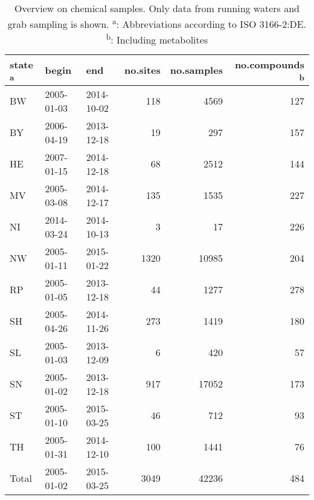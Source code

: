 \begin{table}[ht]
\centering
\caption{Overview on chemical samples. Only data from running waters and grab
sampling is shown. \textsuperscript{a}: Abbreviations according to ISO 3166-2:DE. 
      \textsuperscript{b}: Including metabolites} 
\label{tab:phch_overview}
\begin{tabular}{lllrrr}
  \toprule
state \textsuperscript{a} & begin & end & no.sites & no.samples & no.compounds \textsuperscript{b} \\ 
  \midrule
BW & 2005-01-03 & 2014-10-02 & 118 & 4569 & 127 \\ 
  BY & 2006-04-19 & 2013-12-18 & 19 & 297 & 157 \\ 
  HE & 2007-01-15 & 2014-12-18 & 68 & 2512 & 144 \\ 
  MV & 2005-03-08 & 2014-12-17 & 135 & 1535 & 227 \\ 
  NI & 2014-03-24 & 2014-10-13 & 3 & 17 & 226 \\ 
  NW & 2005-01-11 & 2015-01-22 & 1320 & 10985 & 204 \\ 
  RP & 2005-01-05 & 2013-12-18 & 44 & 1277 & 278 \\ 
  SH & 2005-04-26 & 2014-11-26 & 273 & 1419 & 180 \\ 
  SL & 2005-01-03 & 2013-12-09 & 6 & 420 & 57 \\ 
  SN & 2005-01-02 & 2013-12-18 & 917 & 17052 & 173 \\ 
  ST & 2005-01-10 & 2015-03-25 & 46 & 712 & 93 \\ 
  TH & 2005-01-31 & 2014-12-10 & 100 & 1441 & 76 \\ 
   \midrule
Total & 2005-01-02 & 2015-03-25 & 3049 & 42236 & 484 \\ 
   \bottomrule
\end{tabular}
\end{table}
